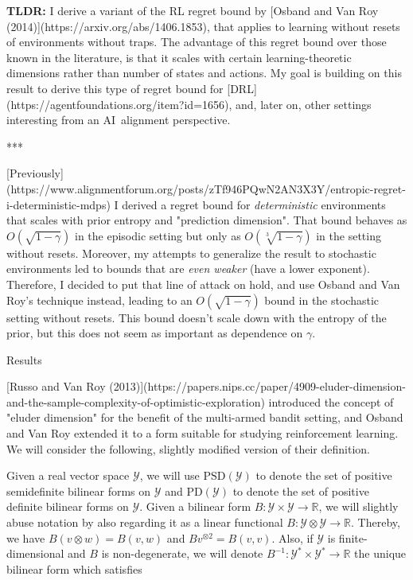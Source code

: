 \documentclass[a4paper]{article}
\newcommand{\Co}[1]{}
\newcommand{\AP}[1]{\left(#1\right)}
\newcommand{\Reals}{\mathbb{R}}
\newcommand{\PD}{\mathrm{PD}}
\newcommand{\PSD}{\mathrm{PSD}}
\newcommand{\B}{B}
\newcommand{\Y}{\mathcal{Y}}
\begin{document}
\textbf{TLDR:}\Co{b} I derive a variant of the RL regret bound by [Osband and Van Roy (2014)](https://arxiv.org/abs/1406.1853), that applies to learning without resets of environments without traps. The advantage of this regret bound over those known in the literature, is that it scales with certain learning-theoretic dimensions rather than number of states and actions. My goal is building on this result to derive this type of regret bound for [DRL](https://agentfoundations.org/item?id=1656), and, later on, other settings interesting from an AI\ alignment perspective.

***

[Previously](https://www.alignmentforum.org/posts/zTf946PQwN2AN3X3Y/entropic-regret-i-deterministic-mdps) I derived a regret bound for \textit{deterministic}\Co{i} environments that scales with prior entropy and "prediction dimension". That bound behaves as $O\AP{\sqrt{1-\gamma}}$ in the episodic setting but only as $O\AP{\sqrt[3]{1-\gamma}}$ in the setting without resets. Moreover, my attempts to generalize the result to stochastic environments led to bounds that are \textit{even weaker}\Co{i} (have a lower exponent). Therefore, I decided to put that line of attack on hold, and use Osband and Van Roy's technique instead, leading to an $O\AP{\sqrt{1-\gamma}}$ bound in the stochastic setting without resets. This bound doesn't scale down with the entropy of the prior, but this does not seem as important as dependence on $\gamma$.

\begin{Huge}Results\end{Huge}

[Russo and Van Roy (2013)](https://papers.nips.cc/paper/4909-eluder-dimension-and-the-sample-complexity-of-optimistic-exploration) introduced the concept of "eluder dimension"  for the benefit of the multi-armed bandit setting, and Osband and Van Roy extended it to a form suitable for studying reinforcement learning. We will consider the following, slightly modified version of their definition.

Given a real vector space $\Y$, we will use $\PSD(\Y)$ to denote the set of positive semidefinite bilinear forms on $\Y$ and $\PD(\Y)$ to denote the set of positive definite bilinear forms on $\Y$. Given a bilinear form $\B:\Y\times\Y\rightarrow\Reals$, we will slightly abuse notation by also regarding it as a linear functional $\B:\Y\otimes\Y\rightarrow\Reals$. Thereby, we have $\B(v \otimes w) = \B(v, w)$ and $\B v^{\otimes 2}=\B (v,v)$. Also, if $\Y$ is finite-dimensional and $\B$ is non-degenerate, we will denote $\B ^{-1}:\Y^*\times\Y^*\rightarrow\Reals$ the unique bilinear form which satisfies
\end{document}
